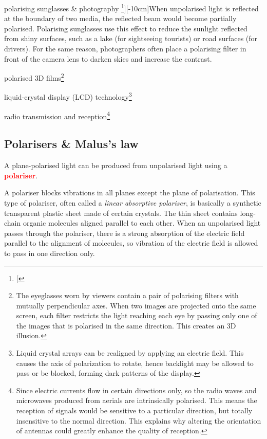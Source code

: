 \documentclass[a4paper,12pt]{book}
\newcommand{\keypoint}[1]{\textbf{\textcolor{red}{#1}}}
\newcommand{\sidenote}[1]{\footnote{#1}}
\newcommand{\keypoint}[1]{\textbf{\textcolor{red}{#1}}}
\begin{document}
\begin{compactitem}
	\item[--] polarising sunglasses \& photography \sidenote[][-10cm]{When unpolarised light is reflected at the boundary of two media, the reflected beam would become partially polarised. Polarising sunglasses use this effect to reduce the sunlight reflected from shiny surfaces, such as a lake (for sightseeing tourists) or road surfaces (for drivers). For the same reason, photographers often place a polarising filter in front of the camera lens to darken skies and increase the contrast.}
	
	\item[--] polarised 3D films\footnote[][-6.5cm]{The eyeglasses worn by viewers contain a pair of polarising filters with mutually perpendicular axes. When two images are projected onto the same screen, each filter restricts the light reaching each eye by passing only one of the images that is polarised in the same direction. This creates an 3D illusion.}
	
	\item[--] liquid-crystal display (LCD) technology\footnote[][-4cm]{Liquid crystal arrays can be realigned by applying an electric field. This causes the axis of polarization to rotate, hence backlight may be allowed to pass or be blocked, forming dark patterns of the display.}
	
	\item[--] radio transmission and reception\footnote[][-2cm]{Since electric currents flow in certain directions only, so the radio waves and microwaves produced from aerials are intrinsically polarised. This means the reception of signals would be sensitive to a particular direction, but totally insensitive to the normal direction. This explains why altering the orientation of antennas could greatly enhance the quality of reception.}
\end{compactitem}

\subsection{Polarisers \& Malus's law}

A plane-polarised light can be produced from unpolarised light using a \keypoint{polariser}.

A polariser blocks vibrations in all planes except the plane of polarisation. This type of polariser, often called a \emph{linear absorptive polariser}, is basically a synthetic transparent plastic sheet made of certain crystals. The thin sheet contains long-chain organic molecules aligned parallel to each other. When an unpolarised light passes through the polariser, there is a strong absorption of the electric field parallel to the alignment of molecules, so vibration of the electric field is allowed to pass in one direction only.
\end{document}
